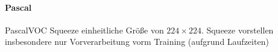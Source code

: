 \paragraph{\gls{Pascal}}

\begin{table}[t]
\centering
{}
\caption[Testgenauigkeiten der \gls{Pascal} Superpixelrepräsentationen]{}
\label{tab:train_pascal}
\end{table}

PascalVOC Squeeze einheitliche Größe von $224 \times 224$.
Squeeze vorstellen
insbesondere nur Vorverarbeitung vorm Training (aufgrund Laufzeiten)
